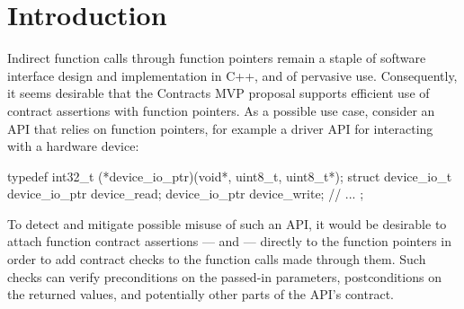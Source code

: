 

\tableofcontents*
\pagebreak





\section{Introduction}
\label{intro}

Indirect function calls through function pointers remain a staple of software interface design and implementation in C++, and of pervasive use. Consequently, it seems desirable that the Contracts MVP proposal \cite{P2900R8} supports efficient use of contract assertions with function pointers. As a possible use case, consider an API that relies on function pointers, for example a driver API for interacting with a hardware device:
\begin{codeblock}
typedef int32_t (*device_io_ptr)(void*, uint8_t, uint8_t*);
struct device_io_t {
  device_io_ptr device_read;
  device_io_ptr device_write;
  // ...
};
\end{codeblock}
To detect and mitigate possible misuse of such an API, it would be desirable to attach function contract assertions ---  and  --- directly to the function pointers in order to add contract checks to the function calls made through them. Such checks can verify preconditions on the passed-in parameters, postconditions on the returned values, and potentially other parts of the API's contract.


